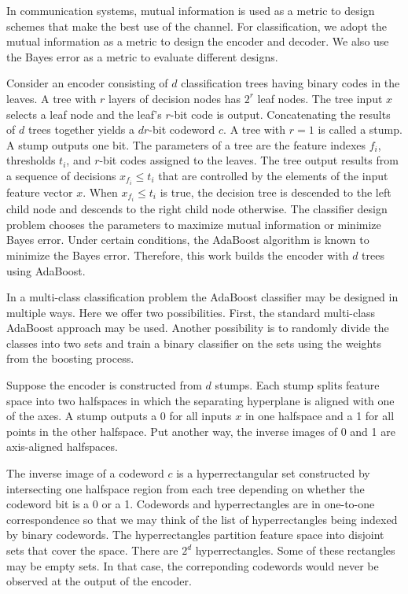 \documentclass{article}
\begin{document}
In communication systems, mutual information is used as a metric to design schemes that make the best use of the channel.  For classification, we adopt the mutual information as a metric to design the encoder and decoder.  We also use the Bayes error as a metric to evaluate different designs.

Consider an encoder consisting of $d$ classification trees having binary codes in the leaves.  A tree with $r$ layers of decision nodes has $2^r$ leaf nodes.  The tree input $x$ selects a leaf node and the leaf's $r$-bit code is output.  Concatenating the results of $d$ trees together yields a $dr$-bit codeword $c$.   A tree with $r=1$ is called a stump.  A stump outputs one bit.  The parameters of a tree are the feature indexes $f_i$, thresholds $t_i$, and $r$-bit codes assigned to the leaves.  The tree output results from a sequence of decisions $x_{f_i} \leq t_i$ that are controlled by the elements of the input feature vector $x$.  When $x_{f_i} \leq t_i$ is true, the decision tree is descended to the left child node and descends to the right child node otherwise.  The classifier design problem chooses the parameters to maximize mutual information or minimize Bayes error.  Under certain conditions, the AdaBoost algorithm is known to minimize the Bayes error.  Therefore, this work builds the encoder with $d$ trees using AdaBoost.

In a multi-class classification problem the AdaBoost classifier may be designed in multiple ways.  Here we offer two possibilities.  First, the standard multi-class AdaBoost approach may be used.  Another possibility is to randomly divide the classes into two sets and train a binary classifier on the sets using the weights from the boosting process.

Suppose the encoder is constructed from $d$ stumps.  Each stump splits feature space into two halfspaces in which the separating hyperplane is aligned with one of the axes.  A stump outputs a 0 for all inputs $x$ in one halfspace and a 1 for all points in the other halfspace.  Put another way, the inverse images of 0 and 1 are axis-aligned halfspaces.

The inverse image of a codeword $c$ is a hyperrectangular set constructed by intersecting one halfspace region from each tree depending on whether the codeword bit is a 0 or a 1.  Codewords and hyperrectangles are in one-to-one correspondence so that we may think of the list of hyperrectangles being indexed by binary codewords.  The hyperrectangles partition feature space into disjoint sets that cover the space.  There are $2^d$ hyperrectangles.  Some of these rectangles may be empty sets.  In that case, the correponding codewords would never be observed at the output of the encoder.
\end{document}
